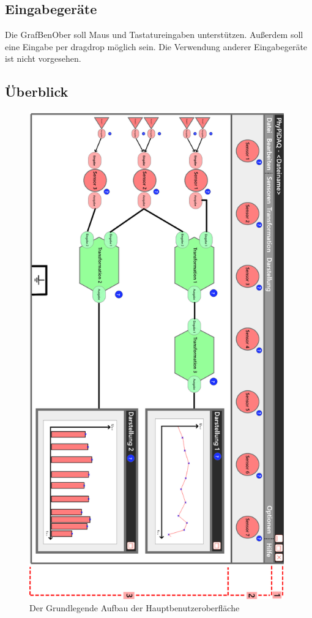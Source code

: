 \documentclass[parskip=full]{scrartcl}
\begin{document}
\subsection{Eingabegeräte}

Die \gls{GrafBenOber} soll Maus und Tastatureingaben unterstützen. Außerdem soll eine Eingabe per \gls{dragdrop} möglich sein.
Die Verwendung anderer Eingabegeräte ist nicht vorgesehen.

\subsection{Überblick}

\begin{figure}[htbp]
	\begin{center}
		\includegraphics[width = 11cm]{Grafik/Konkreter-Anwendungsfall}
		\caption{Der Grundlegende Aufbau der Hauptbenutzeroberfläche}
		\label{GUI_Grundlage}
	\end{center}
\end{figure}
\end{document}
